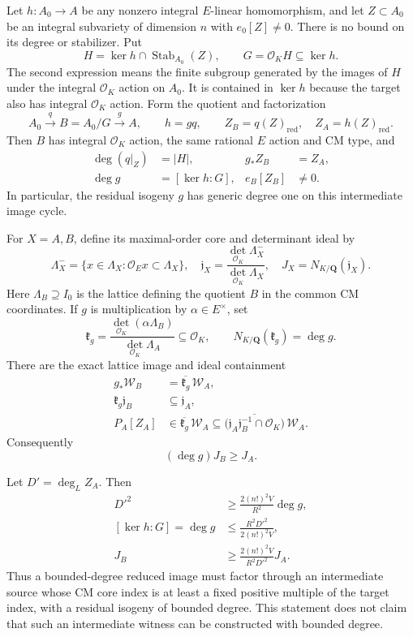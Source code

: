 \documentclass[11pt,a4paper]{article}
\theoremstyle{definition}
\begin{document}
Let \(h:A_0\to A\) be any nonzero integral \(E\)-linear homomorphism, and let \(Z\subset A_0\) be an integral subvariety of dimension \(n\) with \(e_0[Z]\ne0\). There is no bound on its degree or stabilizer. Put \[
 H=\ker h\cap\operatorname{Stab}_{A_0}(Z),
 \qquad
 G=\mathcal O_K H\subseteq\ker h.
\tag{B25.1}
\] The second expression means the finite subgroup generated by the images of \(H\) under the integral \(\mathcal O_K\) action on \(A_0\). It is contained in \(\ker h\) because the target also has integral \(\mathcal O_K\) action. Form the quotient and factorization \[
 A_0\xrightarrow{q}B=A_0/G\xrightarrow{g}A,
 \qquad h=gq,
 \qquad Z_B=q(Z)_{\mathrm{red}},\quad Z_A=h(Z)_{\mathrm{red}}.
\tag{B25.2}
\] Then \(B\) has integral \(\mathcal O_K\) action, the same rational \(E\) action and CM type, and \[
 \begin{aligned}
 \deg(q|_Z)&=|H|,&g_*Z_B&=Z_A,\\
 \deg g&=[\ker h:G],&e_B[Z_B]&\ne0.
 \end{aligned}
\tag{B25.3}
\] In particular, the residual isogeny \(g\) has generic degree one on this intermediate image cycle.

For \(X=A,B\), define its maximal-order core and determinant ideal by \[
 \Lambda_X^-=\{x\in\Lambda_X:\mathcal O_E x\subset\Lambda_X\},
 \quad
 \mathfrak j_X=\frac{\det_{\mathcal O_K}\Lambda_X^-}
                     {\det_{\mathcal O_K}\Lambda_X},
 \quad J_X=N_{K/\mathbf Q}(\mathfrak j_X).
\] Here \(\Lambda_B\supseteq I_0\) is the lattice defining the quotient \(B\) in the common CM coordinates. If \(g\) is multiplication by \(\alpha\in E^\times\), set \[
 \mathfrak k_g=
 \frac{\det_{\mathcal O_K}(\alpha\Lambda_B)}
      {\det_{\mathcal O_K}\Lambda_A}\subseteq\mathcal O_K,
 \qquad N_{K/\mathbf Q}(\mathfrak k_g)=\deg g.
\tag{B25.4}
\] There are the exact lattice image and ideal containment \[
 \begin{aligned}
 g_*\mathscr W_B&=\overline{\mathfrak k_g}\,\mathscr W_A,\\
 \mathfrak k_g\mathfrak j_B&\subseteq\mathfrak j_A,\\
 P_A[Z_A]&\in\overline{\mathfrak k_g}\,\mathscr W_A
 \subseteq
 \overline{\bigl(\mathfrak j_A\mathfrak j_B^{-1}
                         \cap\mathcal O_K\bigr)}\,\mathscr W_A.
 \end{aligned}
\tag{B25.5}
\] Consequently \[
 (\deg g)J_B\ge J_A.
\tag{B25.6}
\]

Let \(D'=\deg_L Z_A\). Then \[
 \begin{aligned}
 D'^2&\ge \frac{2(n!)^2V}{R^2}\deg g,\\
 [\ker h:G]=\deg g
 &\le\frac{R^2D'^2}{2(n!)^2V},\\
 J_B&\ge\frac{2(n!)^2V}{R^2D'^2}J_A.
 \end{aligned}
\tag{B25.7}
\] Thus a bounded-degree reduced image must factor through an intermediate source whose CM core index is at least a fixed positive multiple of the target index, with a residual isogeny of bounded degree. This statement does not claim that such an intermediate witness can be constructed with bounded degree.
\end{document}
